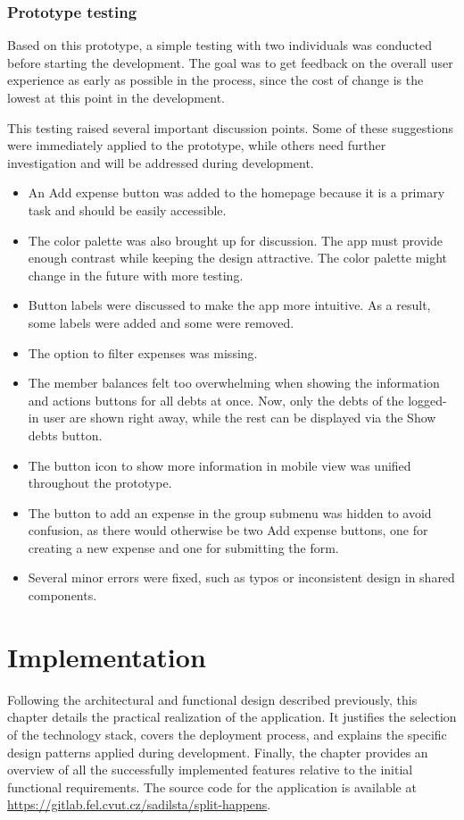 \documentclass{ctuthesis}
\begin{document}
\subsection{Prototype testing}
Based on this prototype, a simple testing with two individuals was conducted before starting the development. The goal was to get feedback on the overall user experience as early as possible in the process, since the cost of change is the lowest at this point in the development. 

This testing raised several important discussion points. Some of these suggestions were immediately applied to the prototype, while others need further investigation and will be addressed during development.
\begin{itemize}
    \item An Add expense button was added to the homepage because it is a primary task and should be easily accessible.
    \item The color palette was also brought up for discussion. The app must provide enough contrast while keeping the design attractive. The color palette might change in the future with more testing.
    \item Button labels were discussed to make the app more intuitive. As a result, some labels were added and some were removed.
    \item The option to filter expenses was missing.
    \item The member balances felt too overwhelming when showing the information and actions buttons for all debts at once. Now, only the debts of the logged-in user are shown right away, while the rest can be displayed via the Show debts button.
    \item The button icon to show more information in mobile view was unified throughout the prototype.
    \item The button to add an expense in the group submenu was hidden to avoid confusion, as there would otherwise be two Add expense buttons, one for creating a new expense and one for submitting the form.
    \item Several minor errors were fixed, such as typos or inconsistent design in shared components.
\end{itemize}

\chapter{Implementation}
Following the architectural and functional design described previously, this chapter details the practical realization of the application. It justifies the selection of the technology stack, covers the deployment process, and explains the specific design patterns applied during development. Finally, the chapter provides an overview of all the successfully implemented features relative to the initial functional requirements. The source code for the application is available at \url{https://gitlab.fel.cvut.cz/sadilsta/split-happens}.
\end{document}
